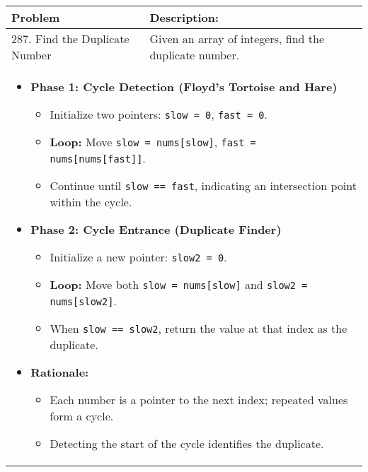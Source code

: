 \begin{summary}
    \begin{center}
        \begin{tabular}{ll}
            \toprule
            \textbf{Problem} & \textbf{Description:} \\
            \midrule
            287. Find the Duplicate Number & Given an array of integers, find the duplicate number. \\
            \multicolumn{2}{p{\linewidth}}{
                \begin{itemize}
                    \item \textbf{Phase 1: Cycle Detection (Floyd's Tortoise and Hare)}
                    \begin{itemize}
                        \item Initialize two pointers: \texttt{slow = 0}, \texttt{fast = 0}.
                        \item \textbf{Loop:} Move \texttt{slow = nums[slow]}, \texttt{fast = nums[nums[fast]]}.
                        \item Continue until \texttt{slow == fast}, indicating an intersection point within the cycle.
                    \end{itemize}
                    
                    \item \textbf{Phase 2: Cycle Entrance (Duplicate Finder)}
                    \begin{itemize}
                        \item Initialize a new pointer: \texttt{slow2 = 0}.
                        \item \textbf{Loop:} Move both \texttt{slow = nums[slow]} and \texttt{slow2 = nums[slow2]}.
                        \item When \texttt{slow == slow2}, return the value at that index as the duplicate.
                    \end{itemize}
                
                    \item \textbf{Rationale:}
                    \begin{itemize}
                        \item Each number is a pointer to the next index; repeated values form a cycle.
                        \item Detecting the start of the cycle identifies the duplicate.
                    \end{itemize}
                \end{itemize}                
            } \\
        \end{tabular}
    \end{center}
\end{summary}
